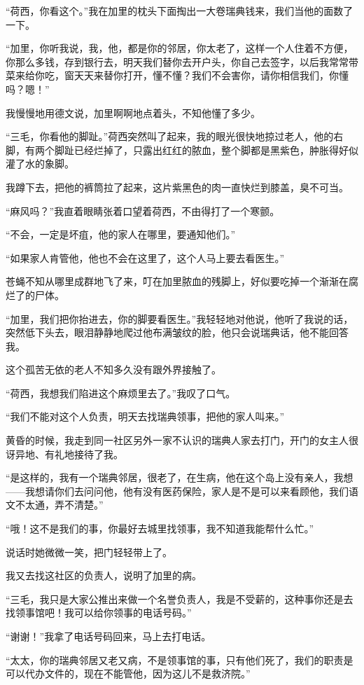 \par “荷西，你看这个。”我在加里的枕头下面掏出一大卷瑞典钱来，我们当他的面数了一下。
\par “加里，你听我说，我，他，都是你的邻居，你太老了，这样一个人住着不方便，你那么多钱，存到银行去，明天我们替你去开户头，你自己去签字，以后我常常带菜来给你吃，窗天天来替你打开，懂不懂？我们不会害你，请你相信我们，你懂吗？嗯！”
\par 我慢慢地用德文说，加里啊啊地点着头，不知他懂了多少。
\par “三毛，你看他的脚趾。”荷西突然叫了起来，我的眼光很快地掠过老人，他的右脚，有两个脚趾已经烂掉了，只露出红红的脓血，整个脚都是黑紫色，肿胀得好似灌了水的象脚。
\par 我蹲下去，把他的裤筒拉了起来，这片紫黑色的肉一直快烂到膝盖，臭不可当。
\par “麻风吗？”我直着眼睛张着口望着荷西，不由得打了一个寒颤。
\par “不会，一定是坏疽，他的家人在哪里，要通知他们。”
\par “如果家人肯管他，他也不会在这里了，这个人马上要去看医生。”
\par 苍蝇不知从哪里成群地飞了来，叮在加里脓血的残脚上，好似要吃掉一个渐渐在腐烂了的尸体。
\par “加里，我们把你抬进去，你的脚要看医生。”我轻轻地对他说，他听了我说的话，突然低下头去，眼泪静静地爬过他布满皱纹的脸，他只会说瑞典话，他不能回答我。
\par 这个孤苦无依的老人不知多久没有跟外界接触了。
\par “荷西，我想我们陷进这个麻烦里去了。”我叹了口气。
\par “我们不能对这个人负责，明天去找瑞典领事，把他的家人叫来。”
\par 黄昏的时候，我走到同一社区另外一家不认识的瑞典人家去打门，开门的女主人很讶异地、有礼地接待了我。
\par “是这样的，我有一个瑞典邻居，很老了，在生病，他在这个岛上没有亲人，我想——我想请你们去问问他，他有没有医药保险，家人是不是可以来看顾他，我们语文不太通，弄不清楚。”
\par “哦！这不是我们的事，你最好去城里找领事，我不知道我能帮什么忙。”
\par 说话时她微微一笑，把门轻轻带上了。
\par 我又去找这社区的负责人，说明了加里的病。
\par “三毛，我只是大家公推出来做一个名誉负责人，我是不受薪的，这种事你还是去找领事馆吧！我可以给你领事的电话号码。”
\par “谢谢！”我拿了电话号码回来，马上去打电话。
\par “太太，你的瑞典邻居又老又病，不是领事馆的事，只有他们死了，我们的职责是可以代办文件的，现在不能管他，因为这儿不是救济院。”
